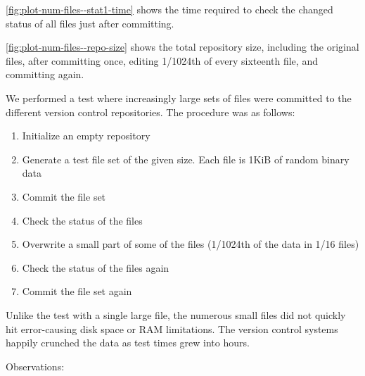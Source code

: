 \autoref{fig:plot-num-files--stat1-time} shows the time
required to check the changed status of all files just after committing.

\autoref{fig:plot-num-files--repo-size} shows the total
repository size, including the original files, after committing once, editing
1/1024th of every sixteenth file, and committing again.


\iffalse

We performed a test where increasingly large sets of files were committed to the
different version control repositories. The procedure was as follows:

\begin{enumerate}
    \setlength{\itemsep}{0pt}
    \setlength{\parskip}{0pt}
    \setlength{\parsep}{0pt}
    \item Initialize an empty repository
    \item Generate a test file set of the given size. Each file is 1KiB of
        random binary data
    \item Commit the file set
    \item Check the status of the files
    \item Overwrite a small part of some of the files (1/1024th of the data in
        1/16 files)
    \item Check the status of the files again
    \item Commit the file set again
\end{enumerate}

Unlike the test with a single large file, the numerous small files did not
quickly hit error-causing disk space or RAM limitations. The version control
systems happily crunched the data as test times grew into hours.

Observations:

